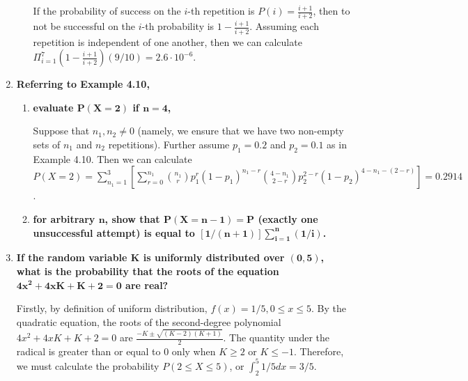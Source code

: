 \documentclass[10pt, oneside]{article}   	%
\theoremstyle{definition}
\begin{document}
\begin{enumerate}[label=4.\arabic*]
\begin{enumerate}
	If the probability of success on the $i$-th repetition is $P(i) = \frac{i+1}{i+2}$, then to not be successful on the $i$-th probability is $1 - \frac{i+1}{i+2}$. Assuming each repetition is independent of one another, then we can calculate $\Pi_{i=1}^7 (1 - \frac{i+1}{i+2}) (9/10) = \boxed{2.6 \cdot 10^{-6}}$.
	
	\end{enumerate}

\item  \begin{tcolorbox}[
  colback=Cerulean!5!white,
  colframe=Cerulean!75!black]
\textbf{Referring to Example 4.10,}
\end{tcolorbox}

	\begin{enumerate}
	\item  \begin{tcolorbox}[
	  colback=Cerulean!5!white,
	  colframe=Cerulean!75!black]
	\textbf{evaluate $\bm{P(X = 2)}$ if $\bm{n=4}$,}
	\end{tcolorbox}
	
	Suppose that $n_1, n_2 \neq 0$ (namely, we ensure that we have two non-empty sets of $n_1$ and $n_2$ repetitions). Further assume $p_1 = 0.2$ and $p_2 = 0.1$ as in Example 4.10. Then we can calculate $P(X = 2) = \sum^3_{n_1 = 1} [ \sum^{n_1}_{r=0} \binom{n_1}{r} p_1^r (1 - p_1)^{n_1 - r} \binom{4 - n_1}{2 - r} p_2^{2-r} (1 - p_2)^{4 - n_1 - (2-r)} ] = \boxed{0.2914}$.
	
	\item  \begin{tcolorbox}[
	  colback=Cerulean!5!white,
	  colframe=Cerulean!75!black]
	\textbf{for arbitrary $\bm{n}$, show that $\bm{P(X = n - 1) = P}$ (exactly one unsuccessful attempt) is equal to $\bm{[1 / (n+1)] \sum^n_{i=1} (1/i)}$.}
	\end{tcolorbox}
		
	\end{enumerate}

\item  \begin{tcolorbox}[
  colback=Cerulean!5!white,
  colframe=Cerulean!75!black]
\textbf{If the random variable $\bm{K}$ is uniformly distributed over $\bm{(0,5)}$, what is the probability that the roots of the equation $\bm{4x^2 + 4xK + K + 2 = 0}$ are real?}
\end{tcolorbox}

Firstly, by definition of uniform distribution, $f(x) = 1/5, 0 \leq x \leq 5$. By the quadratic equation, the roots of the second-degree polynomial $4x^2 + 4xK + K + 2 = 0$ are $\frac{-K \pm \sqrt{(K - 2) (K + 1)}}{2}$. The quantity under the radical is greater than or equal to $0$ only when $K \geq 2$ or $K \leq -1$. Therefore, we must calculate the probability $P(2 \leq X \leq 5)$, or $\int^5_2 1/5 dx = \boxed{3/5}$. 


\end{enumerate}
\end{document}
